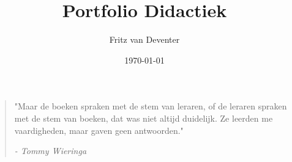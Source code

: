 \documentclass{article}
\title{Portfolio Didactiek}
\author{Fritz van Deventer}
\date{\today}
\begin{document}
 
\maketitle

\begin{quote}
  "Maar de boeken spraken met de stem van leraren, of de leraren spraken met de stem van boeken, dat was niet altijd duidelijk. Ze leerden me vaardigheden, maar gaven geen antwoorden."
  \begin{flushright}
    \textit{ - Tommy Wieringa\nocite{speedboot}}
  \end{flushright}
\end{quote}

\tableofcontents









\clearpage
\begin{appendices}













\end{appendices}
\end{document}
